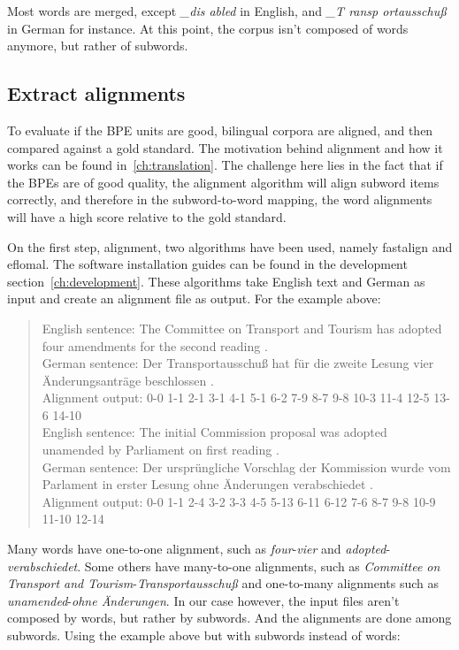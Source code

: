 Most words are merged, except \emph{\_dis abled} in English, and \emph{\_T ransp ortausschuß} in German for instance. At this point, the corpus isn't composed of words anymore, but rather of subwords.

\subsection{Extract alignments}\label{subsec:extractalign}

To evaluate if the BPE units are good, bilingual corpora are aligned, and then compared against a gold standard. The motivation behind alignment and how it works can be found in~\ref{ch:translation}. The challenge here lies in the fact that if the BPEs are of good quality, the alignment algorithm will align subword items correctly, and therefore in the subword-to-word mapping, the word alignments will have a high score relative to the gold standard.

On the first step, alignment, two algorithms have been used, namely fastalign and eflomal. The software installation guides can be found in the development section~\ref{ch:development}. These algorithms take English text and German as input and create an alignment file as output. For the example above:

\begin{quote}
	English sentence: The Committee on Transport and Tourism has adopted four amendments for the second reading .\\
	German sentence: Der Transportausschuß hat für die zweite Lesung vier Änderungsanträge beschlossen .\\
	Alignment output: 0-0 1-1 2-1 3-1 4-1 5-1 6-2 7-9 8-7 9-8 10-3 11-4 12-5 13-6 14-10\\

	English sentence: The initial Commission proposal was adopted unamended by Parliament on first reading .\\
	German sentence: Der ursprüngliche Vorschlag der Kommission wurde vom Parlament in erster Lesung ohne Änderungen verabschiedet .\\
	Alignment output: 0-0 1-1 2-4 3-2 3-3 4-5 5-13 6-11 6-12 7-6 8-7 9-8 10-9 11-10 12-14
\end{quote}

\clearpage
Many words have one-to-one alignment, such as \emph{four}-\emph{vier} and \emph{adopted}-\emph{verabschiedet}. Some others have many-to-one alignments, such as \emph{Committee on Transport and Tourism}-\emph{Transportausschuß} and one-to-many alignments such as \emph{unamended}-\emph{ohne Änderungen}. In our case however, the input files aren't composed by words, but rather by subwords. And the alignments are done among subwords. Using the example above but with subwords instead of words:

